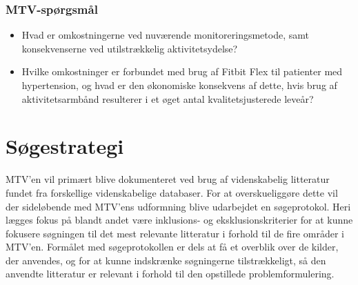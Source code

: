 \subsection{MTV-spørgsmål}
 
\begin{itemize}
\item Hvad er omkostningerne ved nuværende monitoreringsmetode, samt konsekvenserne ved utilstrækkelig aktivitetsydelse? 
\item Hvilke omkostninger er forbundet med brug af Fitbit Flex til patienter med hypertension, og hvad er den økonomiske konsekvens af dette, hvis brug af aktivitetsarmbånd resulterer i et øget antal kvalitetsjusterede leveår?
\end{itemize}

\chapter{Søgestrategi}

MTV’en vil primært blive dokumenteret ved brug af videnskabelig litteratur fundet fra forskellige videnskabelige databaser. For at overskueliggøre dette vil der sideløbende med MTV’ens udformning blive udarbejdet en søgeprotokol. Heri lægges fokus på blandt andet være inklusions- og eksklusionskriterier for at kunne fokusere søgningen til det mest relevante litteratur i forhold til de fire områder i MTV’en. Formålet med søgeprotokollen er dels at få et overblik over de kilder, der anvendes, og for at kunne indskrænke søgningerne tilstrækkeligt, så den anvendte litteratur er relevant i forhold til den opstillede problemformulering. 

